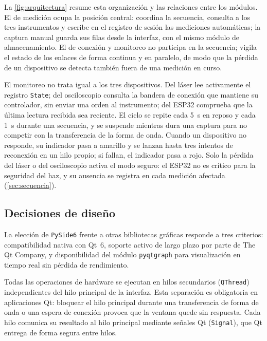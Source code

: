 La \cref{fig:arquitectura} resume esta organización y las relaciones
entre los módulos. El de medición ocupa la posición central: coordina la
secuencia, consulta a los tres instrumentos y escribe en el registro de
sesión las mediciones automáticas; la captura manual guarda sus filas
desde la interfaz, con el mismo módulo de almacenamiento. El de
conexión y monitoreo no participa en la secuencia; vigila el estado de
los enlaces de forma continua y en paralelo, de modo que la pérdida de
un dispositivo se detecta también fuera de una medición en curso.

El monitoreo no trata igual a los tres dispositivos. Del láser lee
activamente el registro \texttt{State}; del osciloscopio consulta la
bandera de conexión que mantiene su controlador, sin enviar una orden
al instrumento; del ESP32 comprueba que la última lectura recibida sea
reciente. El ciclo se repite cada \SI{5}{\second} en reposo y cada
\SI{1}{\second} durante una secuencia, y se suspende mientras dura una
captura para no competir con la transferencia de la forma de onda.
Cuando un dispositivo no responde, su indicador pasa a amarillo y se
lanzan hasta tres intentos de reconexión en un hilo propio; si fallan,
el indicador pasa a rojo. Solo la pérdida del láser o del osciloscopio
activa el modo seguro: el ESP32 no es crítico para la seguridad del
haz, y su ausencia se registra en cada medición afectada
(\cref{sec:secuencia}).

% 

\subsection{Decisiones de diseño}
\label{sec:decisiones}

La elección de \texttt{PySide6} frente a otras bibliotecas gráficas
responde a tres criterios: compatibilidad nativa con Qt~6, soporte
activo de largo plazo por parte de The Qt Company, y disponibilidad del
módulo \texttt{pyqtgraph} para visualización en tiempo real sin pérdida
de rendimiento.

Todas las operaciones de hardware se ejecutan en hilos secundarios
(\texttt{QThread}) independientes del hilo principal de la interfaz.
Esta separación es obligatoria en aplicaciones Qt: bloquear el hilo
principal durante una transferencia de forma de onda o una espera de
conexión provoca que la ventana quede sin respuesta. Cada hilo comunica
su resultado al hilo principal mediante señales Qt (\texttt{Signal}),
que Qt entrega de forma segura entre hilos.

